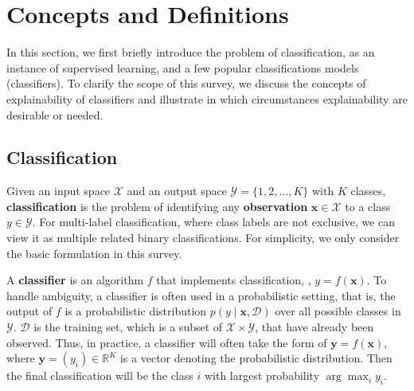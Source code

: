 \chapter{Concepts and Definitions}\label{sec-concepts}

In this section, we first briefly introduce the problem of classification, as an instance of supervised learning, and a few popular classifications models (classifiers). To clarify the scope of this survey, we discuss the concepts of explainability of classifiers and illustrate in which circumstances explainability are desirable or needed. 




\section{Classification} \label{sec:classifier-classification}

Given an input space $\mathcal{X}$ and an output space $\mathcal{Y}=\{1, 2, ..., K\}$ with $K$ classes, \textbf{classification} is the problem of identifying any \textbf{observation} $\mathbf{x}\in\mathcal{X}$ to a class $y\in\mathcal{Y}$. For multi-label classification, where class labels are not exclusive, we can view it as multiple related binary classifications. For simplicity, we only consider the basic formulation in this survey. 

A \textbf{classifier} is an algorithm $f$ that implements classification, \ie, $y = f(\mathbf{x})$. To handle ambiguity, a classifier is often used in a probabilistic setting, that is, the output of $f$ is a probabilistic distribution $p(y\mid \mathbf{x}, \mathcal{D})$ over all possible classes in $\mathcal{Y}$. $\mathcal{D}$ is the training set, which is a subset of $\mathcal{X}\times\mathcal{Y}$, that have already been observed. Thus, in practice, a classifier will often take the form of $\mathbf{y} = f(\mathbf{x})$, where $\mathbf{y}=(y_i)\in\mathbb{R}^K$ is a vector denoting the probabilistic distribution. Then the final classification will be the class $i$ with largest probability $\arg\max_{i}{y_i}$.

